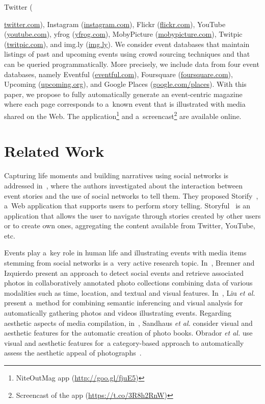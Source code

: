 \documentclass[runningheads,a4paper]{llncs}
\begin{document}
Twitter ({\url{twitter.com}),
Instagram (\url{instagram.com}),
Flickr (\url{flickr.com}),
YouTube (\url{youtube.com}),
yfrog (\url{yfrog.com}),
MobyPicture (\url{mobypicture.com}),
Twitpic (\url{twitpic.com}), and
\mbox{img.ly} (\url{img.ly}).
We consider event databases that maintain listings of past and upcoming events using crowd sourcing techniques and that can be queried programmatically. More precisely, we include data from four event databases, namely Eventful (\url{eventful.com}), Foursquare (\url{foursquare.com}), Upcoming (\url{upcoming.org}), and Google Places (\url{google.com/places}).
With this paper, we propose to fully automatically generate an event-centric magazine where each page corresponds to a~known event that is illustrated with media shared on the Web. The application\footnote{NiteOutMag app (\url{http://goo.gl/fjuE5})} and a~screencast\footnote{Screencast of the app (\url{https://t.co/3R8h2RnW})} are available online. 


\section{Related Work}                                                      \label{sec:related-work}
Capturing life moments and building narratives using social networks is addressed in~\cite{Atosy2011}, where the authors investigated about the interaction between event stories and the use of social networks to tell them. They proposed Storify~\cite{Storify2012}, a~Web application that supports users to perform story telling. Storyful~\cite{Storyful2012} is an application  that allows the user to navigate through stories created by other users or to create own ones, aggregating the content available from Twitter, YouTube, etc.

Events play a~key role in human life and illustrating events with media items stemming from social networks is a~very active research topic. In~\cite{Brenner2012}, Brenner and Izquierdo present an approach to detect social events and retrieve associated photos in collaboratively annotated photo collections combining data of various modalities such as time, location, and textual and visual features. In~\cite{Liu2011}, Liu \emph{et al.} present a~method for combining semantic inferencing and visual analysis for automatically gathering photos and videos illustrating events. Regarding aesthetic aspects of media compilation, in~\cite{Sandhaus2011}, Sandhaus \emph{et al.} consider visual and aesthetic features for the automatic creation of photo books. Obrador \emph{et al.} use visual and aesthetic features for~a category-based approach to automatically assess the aesthetic appeal of photographs~\cite{Obrador2012}.

}
\end{document}
